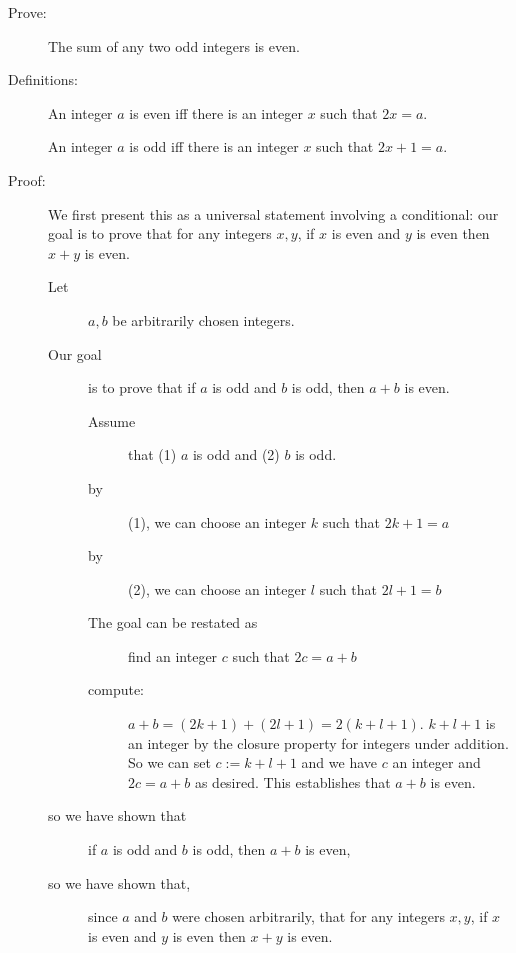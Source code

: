 \documentclass[12pt]{article}
\begin{document}
\newpage

\begin{description}

\item[Prove:]  The sum of any two odd integers is even.

\item[Definitions:]  An integer $a$ is even iff there is an integer $x$ such that $2x=a$.

An integer $a$ is odd iff there is an integer $x$ such that $2x+1=a$.

\item [Proof:]  We first present this as a universal statement involving a conditional:  our goal is to prove that for any integers $x,y$, if $x$ is even and $y$ is even then $x+y$ is even.

\begin{description}

\item [Let] $a,b$ be arbitrarily chosen integers.  \item[Our goal] is to prove that if $a$ is odd and $b$ is odd, then $a+b$ is even.

\begin{description}

\item[Assume] that (1) $a$ is odd and (2) $b$ is odd.

\item[by] (1), we can choose an integer $k$ such that $2k+1=a$

\item[by] (2), we can choose an integer $l$ such that $2l+1=b$

\item[The goal can be restated as]  find an integer $c$ such that $2c=a+b$

\item[compute:]  $a+b = (2k+1) + (2l+1) = 2(k+l+1)$.  $k+l+1$ is an integer by the closure property for integers under addition.  So we can set $c:= k+l+1$ and we have $c$ an integer and $2c=a+b$ as desired.  This establishes that $a+b$ is even.

\end{description}

\item[so we have shown that]  if $a$ is odd and $b$ is odd, then $a+b$ is even,

\item[so we have shown that,] since $a$ and $b$ were chosen arbitrarily, that for any integers $x,y$, if $x$ is even and $y$ is even then $x+y$ is even.

\end{description}

\end{description}
\end{document}
